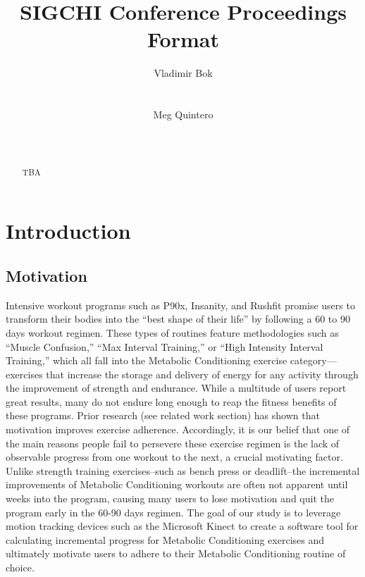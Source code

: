 \documentclass{sigchi}
\begin{document}
\title{SIGCHI Conference Proceedings Format}

\author{
  \alignauthor Vladimir Bok\\
    \\
    \\
  \alignauthor Meg Quintero\\
    \\
    \\
}

\maketitle

\begin{abstract}
TBA
\end{abstract}


\section{Introduction}
\subsection{Motivation}
Intensive workout programs such as P90x, Insanity, and Rushfit promise users to transform their bodies into the “best shape of their life” by following a 60 to 90 days workout regimen.  These types of routines feature methodologies such as “Muscle Confusion,” “Max Interval Training,” or “High Intensity Interval Training,” which all fall into the Metabolic Conditioning exercise category---exercises that increase the storage and delivery of energy for any activity through the improvement of strength and endurance.  While a multitude of users report great results, many do not endure long enough to reap the fitness benefits of these programs. Prior research (see related work section) has shown that motivation improves exercise adherence. Accordingly, it is our belief that one of the main reasons people fail to persevere these exercise regimen is the lack of observable progress from one workout to the next, a crucial motivating factor. Unlike strength training exercises--such as bench press or deadlift--the incremental improvements of Metabolic Conditioning workouts are often not apparent until weeks into the program, causing many users to lose motivation and quit the program early in the 60-90 days regimen. The goal of our study is to leverage motion tracking devices such as the Microsoft Kinect to create a software tool for calculating incremental progress for Metabolic Conditioning exercises and ultimately motivate users to adhere to their Metabolic Conditioning routine of choice.
\end{document}
